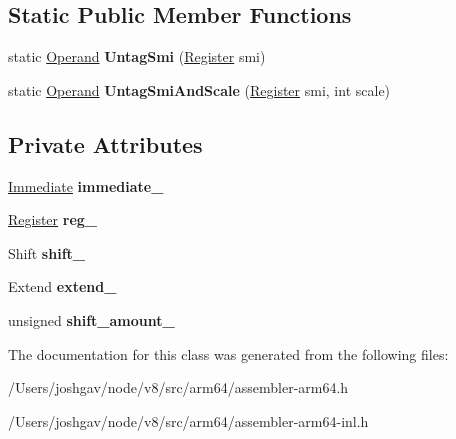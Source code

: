 \subsection*{Static Public Member Functions}
\begin{DoxyCompactItemize}
\item 
static \hyperlink{classv8_1_1internal_1_1_operand}{Operand} {\bfseries Untag\+Smi} (\hyperlink{structv8_1_1internal_1_1_register}{Register} smi)\hypertarget{classv8_1_1internal_1_1_operand_abbaaa835826e5c40aa859b4969ae12fc}{}\label{classv8_1_1internal_1_1_operand_abbaaa835826e5c40aa859b4969ae12fc}

\item 
static \hyperlink{classv8_1_1internal_1_1_operand}{Operand} {\bfseries Untag\+Smi\+And\+Scale} (\hyperlink{structv8_1_1internal_1_1_register}{Register} smi, int scale)\hypertarget{classv8_1_1internal_1_1_operand_ab192154b2af9a0d8d42a399cc7ba193b}{}\label{classv8_1_1internal_1_1_operand_ab192154b2af9a0d8d42a399cc7ba193b}

\end{DoxyCompactItemize}
\subsection*{Private Attributes}
\begin{DoxyCompactItemize}
\item 
\hyperlink{classv8_1_1internal_1_1_immediate}{Immediate} {\bfseries immediate\+\_\+}\hypertarget{classv8_1_1internal_1_1_operand_afc9d2558f756152fbc9912db3595bb96}{}\label{classv8_1_1internal_1_1_operand_afc9d2558f756152fbc9912db3595bb96}

\item 
\hyperlink{structv8_1_1internal_1_1_register}{Register} {\bfseries reg\+\_\+}\hypertarget{classv8_1_1internal_1_1_operand_a5104c31d564943d61483fa943281ba31}{}\label{classv8_1_1internal_1_1_operand_a5104c31d564943d61483fa943281ba31}

\item 
Shift {\bfseries shift\+\_\+}\hypertarget{classv8_1_1internal_1_1_operand_a4f7f7624d43f003f6a5ed6e6718db9cf}{}\label{classv8_1_1internal_1_1_operand_a4f7f7624d43f003f6a5ed6e6718db9cf}

\item 
Extend {\bfseries extend\+\_\+}\hypertarget{classv8_1_1internal_1_1_operand_a67d1f8e017efeaa2bafc5eb6a32077ca}{}\label{classv8_1_1internal_1_1_operand_a67d1f8e017efeaa2bafc5eb6a32077ca}

\item 
unsigned {\bfseries shift\+\_\+amount\+\_\+}\hypertarget{classv8_1_1internal_1_1_operand_a0d3ea184b01031a8e28806358cde1052}{}\label{classv8_1_1internal_1_1_operand_a0d3ea184b01031a8e28806358cde1052}

\end{DoxyCompactItemize}


The documentation for this class was generated from the following files\+:\begin{DoxyCompactItemize}
\item 
/\+Users/joshgav/node/v8/src/arm64/assembler-\/arm64.\+h\item 
/\+Users/joshgav/node/v8/src/arm64/assembler-\/arm64-\/inl.\+h\end{DoxyCompactItemize}
